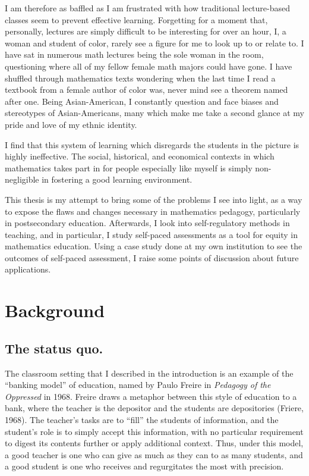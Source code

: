 I am therefore as baffled as I am frustrated with how traditional lecture-based classes seem to prevent effective learning. Forgetting for a moment that, personally, lectures are simply difficult to be interesting for over an hour, I, a woman and student of color, rarely see a figure for me to look up to or relate to. I have sat in numerous math lectures being the sole woman in the room, questioning where all of my fellow female math majors could have gone. I have shuffled through mathematics texts wondering when the last time I read a textbook from a female author of color was, never mind see a theorem named after one. Being Asian-American, I constantly question and face biases and stereotypes of Asian-Americans, many which make me take a second glance at my pride and love of my ethnic identity.

I find that this system of learning which disregards the students in the picture is highly ineffective. The social, historical, and economical contexts in which mathematics takes part in for people especially like myself is simply non-negligible in fostering a good learning environment.

This thesis is my attempt to bring some of the problems I see into light, as a way to expose the flaws and changes necessary in mathematics pedagogy, particularly in postsecondary education. Afterwards, I look into self-regulatory methods in teaching, and in particular, I study self-paced assessments as a tool for equity in mathematics education. Using a case study done at my own institution to see the outcomes of self-paced assessment, I raise some points of discussion about future applications.

\section{Background}
\subsection{The status quo.}

The classroom setting that I described in the introduction is an example of the ``banking model'' of education, named by Paulo Freire in {\it Pedagogy of the Oppressed} in 1968. Freire draws a metaphor between this style of education to a bank, where the teacher is the depositor and the students are depositories (Friere, 1968). The teacher's tasks are to ``fill'' the students of information, and the student's role is to simply accept this information, with no particular requirement to digest its contents further or apply additional context. Thus, under this model, a good teacher is one who can give as much as they can to as many students, and a good student is one who receives and regurgitates the most with precision.

